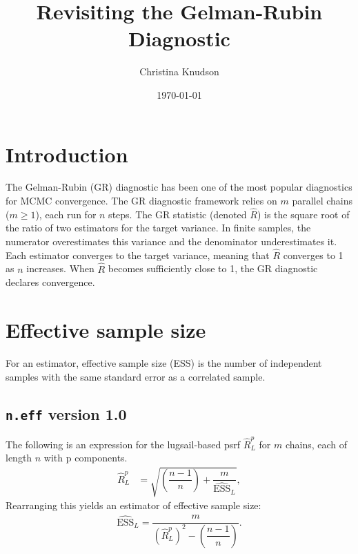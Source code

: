 \documentclass[12pt]{article}
\theoremstyle{remark}
\begin{document}
\title{Revisiting the Gelman-Rubin Diagnostic}
\date{\today}
\author{Christina Knudson}
\maketitle


\section{Introduction} %
\label{sec:introduction}

The Gelman-Rubin (GR) diagnostic has been one of the most popular diagnostics for MCMC convergence. The GR diagnostic framework relies on  $m$  parallel chains ($m \geq 1$), each run for $n$ steps. The GR statistic (denoted $\hat{R}$) is the square root of the ratio of two estimators for the target variance.  In finite samples, the numerator overestimates this variance and the denominator underestimates it. Each estimator converges to the target variance, meaning that $\hat{R}$ converges to 1 as $n$ increases. When $\hat{R}$ becomes sufficiently close to 1, the GR diagnostic declares convergence. 











\section{Effective sample size} %
\label{sec:choosing_delta}

For an estimator, effective sample size (ESS) is the number of independent samples with the same standard error as a correlated sample. 

\subsection{\texttt{n.eff} version 1.0}

The following is an expression for the lugsail-based psrf $\hat{R}^p_L$ for $m$  chains, each of length $n$ with  p components.
\begin{align*}
	\hat{R}^p_L &= \sqrt{ \left(\dfrac{n-1}{n} \right) + \dfrac{m}{\widehat{\text{ESS}}_L}},
\end{align*}
Rearranging this yields an estimator of effective sample size:
\begin{align*}
\widehat{\text{ESS}}_L = \dfrac{m}{\left( \hat{R}^p_L \right)^2 -  \left(\dfrac{n-1}{n} \right)}.
\end{align*}
\end{document}

